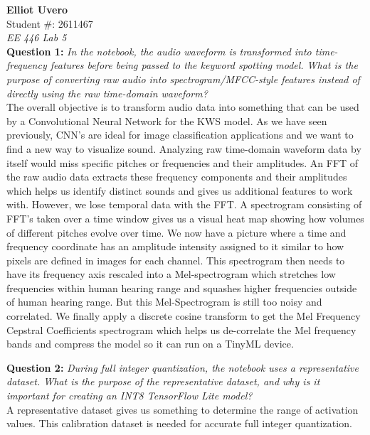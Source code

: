 \documentclass[10pt]{article}
\begin{document}
\textbf{Elliot Uvero}  \\
Student \#: 2611467 \\
\textit{EE 446 Lab 5} \\

\textbf{Question 1:} \textit{In the notebook, the audio waveform is transformed into time-frequency features before being passed to the keyword spotting model. What is the purpose of converting raw audio into spectrogram/MFCC-style features instead of directly using the raw time-domain waveform?} \\

The overall objective is to transform audio data into something that can be used by a Convolutional Neural Network for the KWS model. As we have seen previously, CNN's are ideal for image classification applications and we want to find a new way to visualize sound. Analyzing raw time-domain waveform data by itself would miss specific pitches or frequencies and their amplitudes. An FFT of the raw audio data extracts these frequency components and their amplitudes which helps us identify distinct sounds and gives us additional features to work with. However, we lose temporal data with the FFT. A spectrogram consisting of FFT's taken over a time window gives us a visual heat map showing how volumes of different pitches evolve over time. We now have a picture where a time and frequency coordinate has an amplitude intensity assigned to it similar to how pixels are defined in images for each channel. This spectrogram then needs to have its frequency axis rescaled into a Mel-spectrogram which stretches low frequencies within human hearing range and squashes higher frequencies outside of human hearing range. But this Mel-Spectrogram is still too noisy and correlated. We finally apply a discrete cosine transform to get the Mel Frequency Cepstral Coefficients spectrogram which helps us de-correlate the Mel frequency bands and compress the model so it can run on a TinyML device.

\vspace{0.1in}


\textbf{Question 2:} \textit{During full integer quantization, the notebook uses a representative dataset. What is the purpose of the representative dataset, and why is it important for creating an INT8 TensorFlow Lite model?} \\

A representative dataset gives us something to determine the range of activation values. This calibration dataset is needed for accurate full integer quantization.
\end{document}
